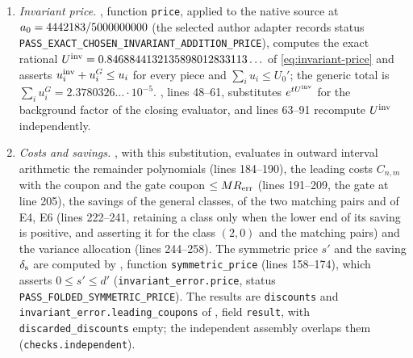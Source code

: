 \begin{certificate}
\begin{enumerate}[label=(\alph*)]
 three- and four-fold checkers and checks the diagonal and aligned-F rows with their
 extra averages), the E-type envelopes with their physical group actions
 () and the orbit masses (,
 ); its result \texttt{checks.envelopes} in
  is
 \texttt{PASS\_FRESH\_SELECTED\_ENVELOPE\_PORTFOLIO}. The orbit masses are those of
 \texttt{invariant\_error.orbit\_masses} in , field \texttt{result}
 (per-class status \texttt{PASS\_INVARIANT\_REFLECTION\_ORBIT\_MASS}).
\item \emph{Invariant price.} ,
 function \texttt{price}, applied to the native source
 at $a_0=4442183/5000000000$ (the selected author adapter records status
 \texttt{PASS\_EXACT\_CHOSEN\_INVARIANT\_ADDITION\_PRICE}), computes the exact rational
 $U^{\mathrm{inv}}=0.8468844132135898012833113\ldots$ of \eqref{eq:invariant-price} and asserts
 $u^{\rm inv}_i+u^G_i\le u_i$ for every piece and $\sum_iu_i\le U_0'$; the generic total is
 $\sum_iu^G_i=2.3780326\ldots\cdot10^{-5}$. ,
 lines 48--61, substitutes $e^{tU^{\mathrm{inv}}}$ for the background factor of the closing
 evaluator, and lines 63--91 recompute $U^{\mathrm{inv}}$ independently.
\item \emph{Costs and savings.} ,
 with this substitution, evaluates in outward interval arithmetic the remainder
 polynomials (lines 184--190), the leading costs $C_{n,m}$ with the coupon and the gate
 coupon $\le MR_{\rm err}$ (lines 191--209, the gate at line 205), the savings of the
 general classes, of the two matching pairs and of E4, E6 (lines 222--241, retaining a
 class only when the lower end of its saving is positive, and asserting it for the
 class $(2,0)$ and the matching pairs) and the variance allocation (lines 244--258). The
 symmetric price $s'$ and the saving $\delta_{\rm s}$ are computed by
 , function
 \texttt{symmetric\_price} (lines 158--174), which asserts $0\le s'\le d'$
 (\texttt{invariant\_error.price}, status \texttt{PASS\_FOLDED\_SYMMETRIC\_PRICE}). The
 results are \texttt{discounts} and \texttt{invariant\_error.leading\_coupons} of
 , field \texttt{result}, with \texttt{discarded\_discounts}
 empty; the independent assembly overlaps them (\texttt{checks.independent}).
\end{enumerate}
\end{certificate}

